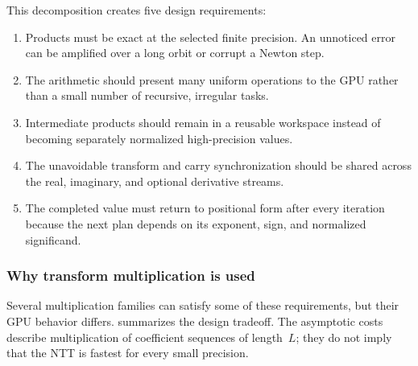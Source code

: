 This decomposition creates five design requirements:

\begin{enumerate}
  \item Products must be exact at the selected finite precision.  An unnoticed
        error can be amplified over a long orbit or corrupt a Newton step.
  \item The arithmetic should present many uniform operations to the GPU rather
        than a small number of recursive, irregular tasks.
  \item Intermediate products should remain in a reusable workspace instead of
        becoming separately normalized high-precision values.
  \item The unavoidable transform and carry synchronization should be shared
        across the real, imaginary, and optional derivative streams.
  \item The completed value must return to positional form after every
        iteration because the next plan depends on its exponent, sign, and
        normalized significand.
\end{enumerate}

\subsubsection{Why transform multiplication is used}

Several multiplication families can satisfy some of these requirements, but
their GPU behavior differs.   summarizes the
design tradeoff.  The asymptotic costs describe multiplication of coefficient
sequences of length~$L$; they do not imply that the NTT is fastest for every
small precision.

